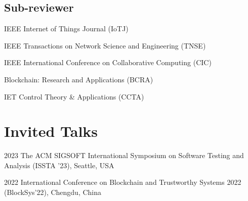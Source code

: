 \documentclass[12pt,letterpaper]{report}
\newcommand{\listitemspace}{0.25em}
\renewenvironment{itemize}
{\begin{list}{}{\setlength{\leftmargin}{0em}
                \setlength{\parskip}{0em}
                \setlength{\itemsep}{\listitemspace}
                \setlength{\parsep}{\listitemspace}}}
{\end{list}}
\begin{document}
    \subsection*{Sub-reviewer}
    \begin{itemize}
        \item IEEE Internet of Things Journal (IoTJ)
        \item IEEE Transactions on Network Science and Engineering (TNSE)
        \item IEEE International Conference on Collaborative Computing (CIC)
        \item Blockchain: Research and Applications (BCRA)
        \item IET Control Theory \& Applications (CCTA)
    \end{itemize}

    \section*{Invited Talks}
    \begin{tablist}
        \item[2023] \tab{}The ACM SIGSOFT International Symposium on Software Testing and Analysis (ISSTA '23), Seattle, USA
        \item[2022] \tab{}International Conference on Blockchain and Trustworthy Systems 2022 (BlockSys'22), Chengdu, China
    \end{tablist}


\end{document}
